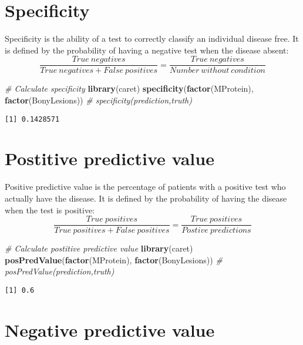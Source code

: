 \documentclass[]{book}
\newenvironment{Shaded}{\begin{snugshade}}{\end{snugshade}}
\newcommand{\KeywordTok}[1]{\textcolor[rgb]{0.13,0.29,0.53}{\textbf{#1}}}
\newcommand{\CommentTok}[1]{\textcolor[rgb]{0.56,0.35,0.01}{\textit{#1}}}
\newcommand{\NormalTok}[1]{#1}
\theoremstyle{definition}
\theoremstyle{definition}
\theoremstyle{definition}
\theoremstyle{remark}
\begin{document}
\section{Specificity}\label{specificity}

Specificity is the ability of a test to correctly classify an individual
disease free. It is defined by the probability of having a negative test
when the disease absent:
\[{\frac{True\ negatives}{True\ negatives + False\ positives}=\frac{True\ negatives}{Number\ without\ condition}}\]

\begin{Shaded}
\begin{Highlighting}[]
\CommentTok{# Calculate specificity}
\KeywordTok{library}\NormalTok{(caret)}
\KeywordTok{specificity}\NormalTok{(}\KeywordTok{factor}\NormalTok{(MProtein), }\KeywordTok{factor}\NormalTok{(BonyLesions)) }\CommentTok{# specificity(prediction,truth)}
\end{Highlighting}
\end{Shaded}

\begin{verbatim}
[1] 0.1428571
\end{verbatim}

\section{Postitive predictive value}\label{postitive-predictive-value}

Positive predictive value is the percentage of patients with a positive
test who actually have the disease. It is defined by the probability of
having the disease when the test is positive:
\[{\frac{True\ positives}{True\ positives + False\ positives}=\frac{True\ positives}{Postive\ predictions}}\]

\begin{Shaded}
\begin{Highlighting}[]
\CommentTok{# Calculate postitive predictive value}
\KeywordTok{library}\NormalTok{(caret)}
\KeywordTok{posPredValue}\NormalTok{(}\KeywordTok{factor}\NormalTok{(MProtein), }\KeywordTok{factor}\NormalTok{(BonyLesions)) }\CommentTok{# posPredValue(prediction,truth)}
\end{Highlighting}
\end{Shaded}

\begin{verbatim}
[1] 0.6
\end{verbatim}

\section{Negative predictive value}\label{negative-predictive-value}
\end{document}
